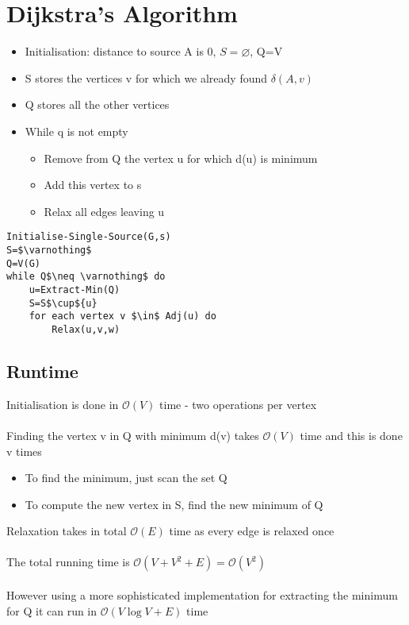 \documentclass{article}[18pt]
\begin{document}
\section{Dijkstra's Algorithm}
\begin{itemize}
	\item Initialisation: distance to source A is 0, $S=\varnothing$, Q=V
	\item S stores the vertices v for which we already found $\delta(A,v)$
	\item Q stores all the other vertices
	\item While q is not empty
	\begin{itemize}
		\item Remove from Q the vertex u for which d(u) is minimum
		\item Add this vertex to s
		\item Relax all edges leaving u
	\end{itemize} 
\end{itemize}
\begin{lstlisting}[caption=Dijkstra({G,w,s})]
Initialise-Single-Source(G,s)
S=$\varnothing$
Q=V(G)
while Q$\neq \varnothing$ do
	u=Extract-Min(Q)
	S=S$\cup${u}
	for each vertex v $\in$ Adj(u) do
		Relax(u,v,w)
\end{lstlisting}
\subsection{Runtime}
Initialisation is done in $\mathcal{O}(V)$ time  - two operations per vertex\\
\\
Finding the vertex v in Q with minimum d(v)  takes $\mathcal{O}(V)$ time and this is done v times
\begin{itemize}
	\item To find the minimum, just scan the set Q
	\item To compute the new vertex in S, find the new minimum of Q
\end{itemize}
Relaxation takes in total $\mathcal{O}(E)$ time as every edge is relaxed once\\
\\
The total running time is $\mathcal{O}(V+V^2+E)=\mathcal{O}(V^2)$\\
\\
However using a more sophisticated implementation for extracting the minimum for Q it can run in $\mathcal{O}(V\log V+E)$ time
\end{document}
